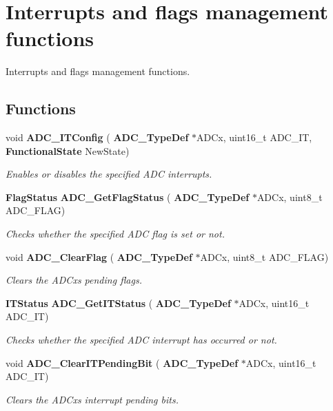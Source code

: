 \section{Interrupts and flags management functions}
\label{group__ADC__Group7}


Interrupts and flags management functions.  


\subsection*{Functions}
\begin{DoxyCompactItemize}
\item 
void \textbf{ A\+D\+C\+\_\+\+I\+T\+Config} (\textbf{ A\+D\+C\+\_\+\+Type\+Def} $\ast$A\+D\+Cx, uint16\+\_\+t A\+D\+C\+\_\+\+IT, \textbf{ Functional\+State} New\+State)
\begin{DoxyCompactList}\small\item\em Enables or disables the specified A\+DC interrupts. \end{DoxyCompactList}\item 
\textbf{ Flag\+Status} \textbf{ A\+D\+C\+\_\+\+Get\+Flag\+Status} (\textbf{ A\+D\+C\+\_\+\+Type\+Def} $\ast$A\+D\+Cx, uint8\+\_\+t A\+D\+C\+\_\+\+F\+L\+AG)
\begin{DoxyCompactList}\small\item\em Checks whether the specified A\+DC flag is set or not. \end{DoxyCompactList}\item 
void \textbf{ A\+D\+C\+\_\+\+Clear\+Flag} (\textbf{ A\+D\+C\+\_\+\+Type\+Def} $\ast$A\+D\+Cx, uint8\+\_\+t A\+D\+C\+\_\+\+F\+L\+AG)
\begin{DoxyCompactList}\small\item\em Clears the A\+D\+Cx\textquotesingle{}s pending flags. \end{DoxyCompactList}\item 
\textbf{ I\+T\+Status} \textbf{ A\+D\+C\+\_\+\+Get\+I\+T\+Status} (\textbf{ A\+D\+C\+\_\+\+Type\+Def} $\ast$A\+D\+Cx, uint16\+\_\+t A\+D\+C\+\_\+\+IT)
\begin{DoxyCompactList}\small\item\em Checks whether the specified A\+DC interrupt has occurred or not. \end{DoxyCompactList}\item 
void \textbf{ A\+D\+C\+\_\+\+Clear\+I\+T\+Pending\+Bit} (\textbf{ A\+D\+C\+\_\+\+Type\+Def} $\ast$A\+D\+Cx, uint16\+\_\+t A\+D\+C\+\_\+\+IT)
\begin{DoxyCompactList}\small\item\em Clears the A\+D\+Cx\textquotesingle{}s interrupt pending bits. \end{DoxyCompactList}\end{DoxyCompactItemize}


